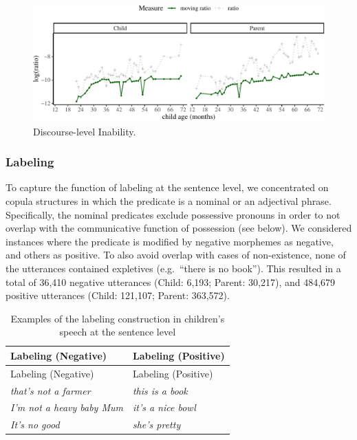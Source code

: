 \documentclass[
  english,
  man,floatsintext]{apa6}
\begin{document}
\begin{figure}[H]

{\centering \includegraphics{neg_construction_article_files/figure-latex/inabilitydiscourse-1} 

}

\caption{Discourse-level Inability.}\label{fig:inabilitydiscourse}
\end{figure}

\hypertarget{labeling}{%
\subsubsection{Labeling}\label{labeling}}

To capture the function of labeling at the sentence level, we concentrated on copula structures in which the predicate is a nominal or an adjectival phrase. Specifically, the nominal predicates exclude possessive pronouns in order to not overlap with the communicative function of possession (see below). We considered instances where the predicate is modified by negative morphemes as negative, and others as positive. To also avoid overlap with cases of non-existence, none of the utterances contained expletives (e.g.~``there is no book''). This resulted in a total of 36,410 negative utterances (Child: 6,193; Parent: 30,217), and 484,679 positive utterances (Child: 121,107; Parent: 363,572).

\begin{longtable}[]{@{}ll@{}}
\caption{\label{tab:label} Examples of the labeling construction in children's speech at the sentence level}\tabularnewline
\toprule
Labeling (Negative) & Labeling (Positive) \\
\midrule
\endfirsthead
\toprule
Labeling (Negative) & Labeling (Positive) \\
\midrule
\endhead
\emph{that's not a farmer} & \emph{this is a book} \\
\emph{I'm not a heavy baby Mum} & \emph{it's a nice bowl} \\
\emph{It's no good} & \emph{she's pretty} \\
\bottomrule
\end{longtable}
\end{document}
